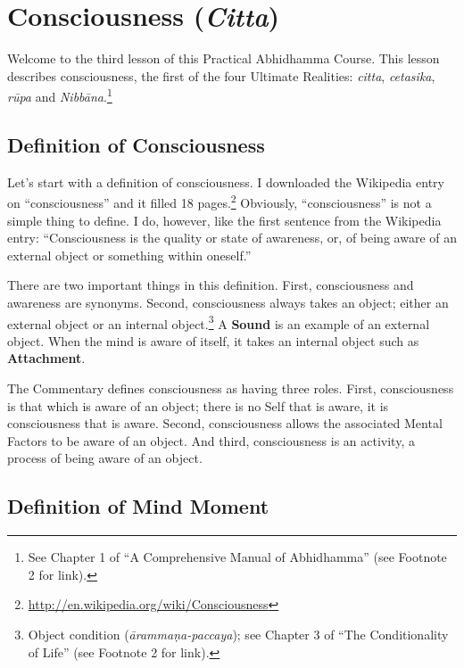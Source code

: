\section{Consciousness (\textit{Citta})}

Welcome to the third lesson of this Practical Abhidhamma Course. This lesson describes consciousness, the first of the four Ultimate Realities: \textit{citta}, \textit{cetasika}, \textit{rūpa} and \textit{Nibbāna}.\footnote{See Chapter 1 of “A Comprehensive Manual of Abhidhamma” (see Footnote 2 for link).}

\subsection*{Definition of Consciousness}

Let’s start with a definition of consciousness. I downloaded the Wikipedia entry on “consciousness” and it filled 18 pages.\footnote{\url{http://en.wikipedia.org/wiki/Consciousness}} Obviously, “consciousness” is not a simple thing to define. I do, however, like the first sentence from the Wikipedia entry: “Consciousness is the quality or state of awareness, or, of being aware of an external object or something within oneself.”

There are two important things in this definition. First, consciousness and awareness are synonyms. Second, consciousness always takes an object; either an external object or an internal object.\footnote{Object condition (\textit{ārammaṇa-paccaya}); see Chapter 3 of “The Conditionality of Life” (see Footnote 2 for link).} A \textbf{Sound} is an example of an external object. When the mind is aware of itself, it takes an internal object such as \textbf{Attachment}.

The Commentary defines consciousness as having three roles. First, consciousness is that which is aware of an object; there is no Self that is aware, it is consciousness that is aware. Second, consciousness allows the associated Mental Factors to be aware of an object. And third, consciousness is an activity, a process of being aware of an object.

\subsection*{Definition of Mind Moment}

